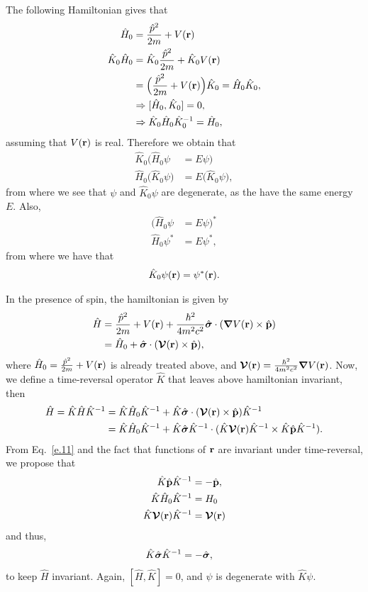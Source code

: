 \documentclass[floatfix,prb,aps,superscriptaddress,11pt]{revtex4}
\begin{document}
The following Hamiltonian gives that 
\begin{align}\label{e.20}
\hat H_0&=\frac{\hat p^2}{2m}+V(\mathbf{r}) 
\nonumber\\
\hat K_0 
\hat H_0&=\hat K_0 \frac{\hat p^2}{2m}+\hat K_0  V(\mathbf{r}) 
\nonumber\\
&=
\Big( \frac{\hat p^2}{2m}+  V(\mathbf{r})\Big) \hat  K _0 
=\hat H_0\hat K_0,
\nonumber\\
&\Rightarrow [\hat H_0,\hat K_0]=0,
\nonumber\\
&\Rightarrow \hat K_0\hat H_0\hat K^{-1}_0=\hat H_0,
\end{align}
assuming that $V(\mathbf{r})$ is real. Therefore we obtain that
\begin{align}\label{e.13n}
\hat K_0\Big(\hat H_0\psi&=E\psi\Big) 
\nonumber\\
\hat H_0 \Big(\hat K_0\psi\Big)&=E \Big(\hat K_0\psi\Big)  
,
\end{align} 
from where we see that $\psi$ and $\hat K_0\psi$ are degenerate, as
the have the same energy $E$. Also,
\begin{align}\label{e.14}
\Big(\hat H_0\psi&=E\psi\Big)^* 
\nonumber\\
\hat H_0 \psi^*&=E \psi^* 
,
\end{align}
from where
we have that
\begin{align}\label{e.11nn}
\hat K_0\psi(\mathbf{r})=\psi^*(\mathbf{r})
.
\end{align}

In the presence of spin, the hamiltonian is given by 
\begin{align}\label{e.30}
\hat H&=
\frac{\hat p^2}{2m} + V(\mathbf{r}) 
+\frac{\hbar^2}{4m^2c^2}
\hat{\boldsymbol{\sigma}}\cdot(\boldsymbol{\nabla} V(\mathbf{r})\times\hat {\mathbf{p}}) 
\nonumber\\
&=
\hat H_0+
\hat{\boldsymbol{\sigma}}\cdot(\boldsymbol{\mathcal{\cal V}} (\mathbf{r})\times\hat {\mathbf{p}}) 
,
\end{align} 
where $\hat H_0=\frac{\hat p^2}{2m} + V(\mathbf{r}) $ is already treated
above, and $\boldsymbol{\mathcal{\cal V}}(\mathbf{r})=\frac{\hbar^2}{4m^2c^2}\boldsymbol{\nabla} V (\mathbf{r})$.
Now, we define a time-reversal operator $\hat K$ that leaves above
hamiltonian invariant, then 
\begin{align}\label{e.31}
\hat H 
=
\hat K 
\hat H 
\hat K^{-1}
&=
\hat K 
\hat H_0 
\hat K^{-1}
+
\hat K 
\hat{\boldsymbol{\sigma}}\cdot(\boldsymbol{\mathcal{\cal V}} (\mathbf{r})\times\hat {\mathbf{p}}) \hat K^{-1}
\nonumber\\
&=
\hat K \hat H_0 \hat K^{-1}
+
\hat K \hat{\boldsymbol{\sigma}} \hat K^{-1}
\cdot(
\hat K \boldsymbol{\mathcal{\cal V}} (\mathbf{r}) \hat K^{-1}
\times 
\hat K \hat {\mathbf{p}} \hat K^{-1}
).
\end{align}
From Eq.~\eqref{e.11} and the fact that functions of $\mathbf{r}$ are
invariant under time-reversal, we propose that
\begin{align}\label{e.32}
\hat K \hat {\mathbf{p}} \hat K^{-1}&=-\hat{\mathbf{p}},
\nonumber\\
\hat K \hat H_0 \hat K^{-1}&=H_0
\nonumber\\
\hat K \boldsymbol{\mathcal{\cal V}} (\mathbf{r}) \hat K^{-1}&=\boldsymbol{\mathcal{\cal V}} (\mathbf{r})
\end{align}
and thus,
\begin{align}\label{e.33}
\hat K \hat{\boldsymbol{\sigma}} \hat K^{-1}&=-\hat{\boldsymbol{\sigma}} 
,
\end{align}
to keep $\hat H$ invariant. Again, $[\hat H,\hat K]=0$, and $\psi$ is
degenerate with $\hat K\psi$.
\end{document}
